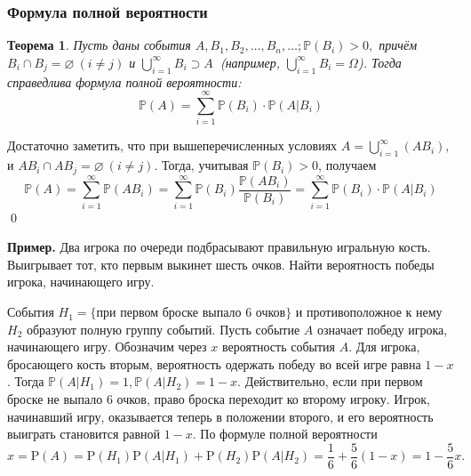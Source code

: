 \documentclass[oneside,final,14pt]{extreport}
\newcommand\myex{{\bf Пример.}}
\newcommand\myprob[1]{{\mathbb{P}(#1)}}
\renewenvironment{proof}{{\bfseries Доказательство.}}{\qed}
\newtheorem{thm}{Теорема}[section]
\theoremstyle{definition}
\begin{document}
\subsubsection{Формула полной вероятности}
\begin{thm}
    Пусть даны события $A, B_1, B_2, \ldots, B_n, \ldots; \myprob{B_i} > 0, $ причём $B_i \cap B_j = \varnothing~(i \neq j)$ и $\bigcup\limits_{i=1}^{\infty}B_i \supset A~$ (например, $\bigcup\limits_{i=1}^{\infty}B_i = \Omega$). Тогда справедлива {\it формула полной вероятности:}
\begin{equation*}
    \mathbb{P}(A)=\sum_{i=1}^{\infty} \mathbb{P}\left(B_{i}\right) \cdot \mathbb{P}\left(A | B_{i}\right)
\end{equation*}
\end{thm}

\begin{proof}
    Достаточно заметить, что при вышеперечисленных условиях $A = \bigcup\limits_{i=1}^{\infty}(AB_i),$ и $AB_i \cap AB_j = \varnothing ~(i \neq j).$ Тогда, учитывая $\myprob{B_i} > 0$, получаем
    \begin{equation*}
        \mathbb{P}(A)=\sum_{i=1}^{\infty} \mathbb{P}\left(A B_{i}\right)=\sum_{i=1}^{\infty} \mathbb{P}\left(B_{i}\right) \frac{\mathbb{P}\left(A B_{i}\right)}{\mathbb{P}\left(B_{i}\right)}=\sum_{i=1}^{\infty} \mathbb{P}\left(B_{i}\right) \cdot \mathbb{P}\left(A | B_{i}\right)
    \end{equation*}
\end{proof}

\myex{} Два игрока по очереди подбрасывают правильную игральную кость. Выигрывает тот, кто первым выкинет шесть очков. Найти вероятность победы игрока, начинающего игру.

События $H_1 = \text{\{при первом броске выпало 6 очков\}}$ и противоположное к нему $H_2$ образуют полную группу событий. Пусть событие $A$
означает победу игрока, начинающего игру. Обозначим через $x$ вероятность
события $A$. Для игрока, бросающего кость вторым, вероятность одержать
победу во всей игре равна $1 - x$. Тогда $\myprob{A | H_1} = 1, \myprob{A | H_2} = 1 - x$. Действительно, если при первом броске не выпало 6 очков, право броска переходит ко второму игроку. Игрок, начинавший игру, оказывается теперь в положении второго, и его вероятность выиграть становится равной $1 - x$. По формуле полной вероятности
$$x=\mathrm{P}(A)=\mathrm{P}\left(H_{1}\right) \mathrm{P}\left(A | H_{1}\right)+\mathrm{P}\left(H_{2}\right) \mathrm{P}\left(A | H_{2}\right)=\frac{1}{6}+\frac{5}{6}(1-x)=1-\frac{5}{6} x.$$
\end{document}
